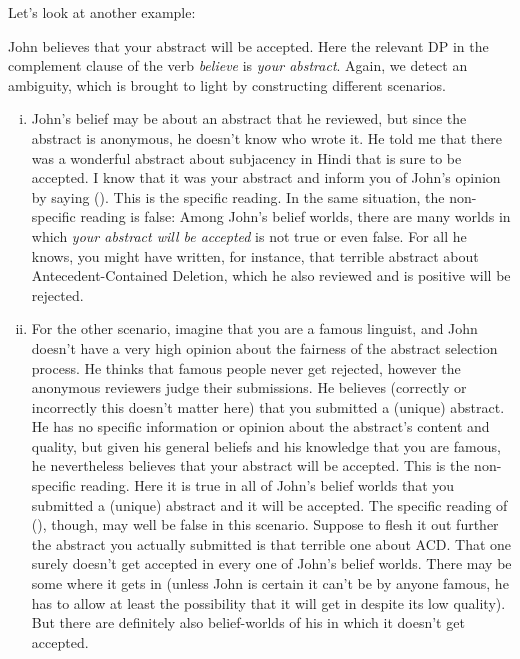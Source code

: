 Let's look at another example:

\ex John believes that your abstract will be accepted. \xe
%
Here the relevant DP in the complement clause of the verb \emph{believe} is
\emph{your abstract}. Again, we detect an ambiguity, which is brought to light
by constructing different scenarios.

\begin{enumerate}[(i)]
	
\item John's belief may be about an abstract that he reviewed, but since the
  abstract is anonymous, he doesn't know who wrote it. He told me that there was
  a wonderful abstract about subjacency in Hindi that is sure to be accepted. I
  know that it was your abstract and inform you of John's opinion by saying
  (\lastx). This is the specific reading. In the same situation, the non-specific
  reading is false: Among John's belief worlds, there are many worlds in which
  \emph{your abstract will be accepted} is not true or even false. For all he
  knows, you might have written, for instance, that terrible abstract about
  Antecedent-Contained Deletion, which he also reviewed and is positive will be
  rejected.
	
\item For the other scenario, imagine that you are a famous linguist, and John
  doesn't have a very high opinion about the fairness of the abstract selection
  process. He thinks that famous people never get rejected, however the
  anonymous reviewers judge their submissions. He believes (correctly or
  incorrectly \dash this doesn't matter here) that you submitted a (unique)
  abstract. He has no specific information or opinion about the abstract's
  content and quality, but given his general beliefs and his knowledge that you
  are famous, he nevertheless believes that your abstract will be accepted. This
  is the non-specific reading. Here it is true in all of John's belief worlds
  that you submitted a (unique) abstract and it will be accepted. The specific
  reading of (\lastx), though, may well be false in this scenario. Suppose \dash to
  flesh it out further \dash the abstract you actually submitted is that terrible
  one about ACD. That one surely doesn't get accepted in every one of John's
  belief worlds. There may be some where it gets in (unless John is certain it
  can't be by anyone famous, he has to allow at least the possibility that it
  will get in despite its low quality). But there are definitely also
  belief-worlds of his in which it doesn't get accepted.
	

\end{enumerate}
